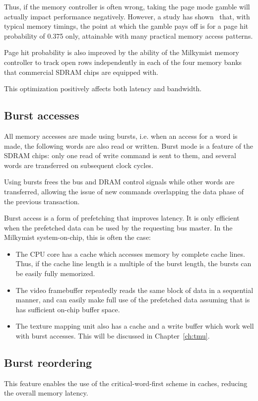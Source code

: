 \documentclass[a4paper,11pt]{kthesis}
\begin{document}
Thus, if the memory controller is often wrong, taking the page mode gamble will actually impact performance negatively. However, a study has shown~\cite{pagemode} that, with typical memory timings, the point at which the gamble pays off is for a page hit probability of 0.375 only, attainable with many practical memory access patterns.

Page hit probability is also improved by the ability of the Milkymist memory controller to track open rows independently in each of the four memory banks that commercial SDRAM chips are equipped with.

This optimization positively affects both latency and bandwidth.

\subsection{Burst accesses}
\label{subsec:fmlburst}
All memory accesses are made using bursts, i.e. when an access for a word is made, the following words are also read or written. Burst mode is a feature of the SDRAM chips: only one read of write command is sent to them, and several words are transferred on subsequent clock cycles.

Using bursts frees the bus and DRAM control signals while other words are transferred, allowing the issue of new commands overlapping the data phase of the previous transaction.

Burst access is a form of prefetching that improves latency. It is only efficient when the prefetched data can be used by the requesting bus master. In the Milkymist system-on-chip, this is often the case:
\begin{itemize}
\item The CPU core has a cache which accesses memory by complete cache lines. Thus, if the cache line length is a multiple of the burst length, the bursts can be easily fully memorized.
\item The video framebuffer repeatedly reads the same block of data in a sequential manner, and can easily make full use of the prefetched data assuming that is has sufficient on-chip buffer space.
\item The texture mapping unit also has a cache and a write buffer which work well with burst accesses. This will be discussed in Chapter~\ref{ch:tmu}.
\end{itemize}

\subsection{Burst reordering}
\label{subsec:fmlborder}
This feature enables the use of the critical-word-first scheme in caches, reducing the overall memory latency.
\end{document}
